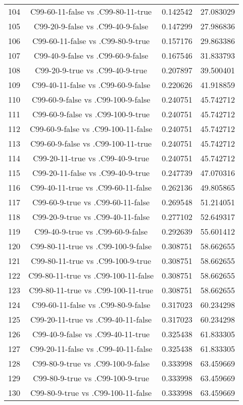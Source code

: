 \documentclass[a4paper,10pt]{article}
\begin{document}
\begin{landscape}
\begin{table}[!htp]
\begin{tabular}{cccc}
104&C99-60-11-false vs .C99-80-11-true&0.142542&27.083029\\
105&C99-20-9-false vs .C99-40-9-false&0.147299&27.986836\\
106&C99-60-11-false vs .C99-80-9-true&0.157176&29.863386\\
107&C99-40-9-false vs .C99-60-9-false&0.167546&31.833793\\
108&C99-20-9-true vs .C99-40-9-true&0.207897&39.500401\\
109&C99-40-11-false vs .C99-60-9-false&0.220626&41.918859\\
110&C99-60-9-false vs .C99-100-9-false&0.240751&45.742712\\
111&C99-60-9-false vs .C99-100-9-true&0.240751&45.742712\\
112&C99-60-9-false vs .C99-100-11-false&0.240751&45.742712\\
113&C99-60-9-false vs .C99-100-11-true&0.240751&45.742712\\
114&C99-20-11-true vs .C99-40-9-true&0.240751&45.742712\\
115&C99-20-11-false vs .C99-40-9-true&0.247739&47.070316\\
116&C99-40-11-true vs .C99-60-11-false&0.262136&49.805865\\
117&C99-60-9-true vs .C99-60-11-false&0.269548&51.214051\\
118&C99-20-9-true vs .C99-40-11-false&0.277102&52.649317\\
119&C99-40-9-true vs .C99-60-9-false&0.292639&55.601412\\
120&C99-80-11-true vs .C99-100-9-false&0.308751&58.662655\\
121&C99-80-11-true vs .C99-100-9-true&0.308751&58.662655\\
122&C99-80-11-true vs .C99-100-11-false&0.308751&58.662655\\
123&C99-80-11-true vs .C99-100-11-true&0.308751&58.662655\\
124&C99-60-11-false vs .C99-80-9-false&0.317023&60.234298\\
125&C99-20-11-true vs .C99-40-11-false&0.317023&60.234298\\
126&C99-40-9-false vs .C99-40-11-true&0.325438&61.833305\\
127&C99-20-11-false vs .C99-40-11-false&0.325438&61.833305\\
128&C99-80-9-true vs .C99-100-9-false&0.333998&63.459669\\
129&C99-80-9-true vs .C99-100-9-true&0.333998&63.459669\\
130&C99-80-9-true vs .C99-100-11-false&0.333998&63.459669\\

\end{tabular}
\end{table}
\end{landscape}
\end{document}
